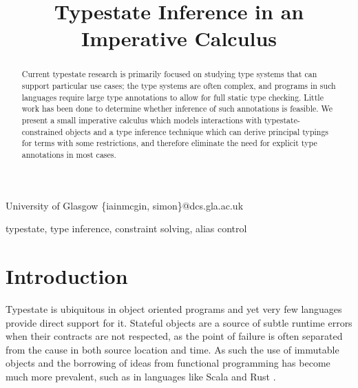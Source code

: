\documentclass[preprint]{sigplanconf}
\begin{document}
\copyrightdata{[to be supplied]} 


\title{Typestate Inference in an Imperative Calculus}

           {University of Glasgow}
           {\{iainmcgin, simon\}@dcs.gla.ac.uk}

\maketitle

\begin{abstract}
Current typestate research is primarily focused on studying
type systems that can support particular use cases;
the type systems are often complex, and programs in such languages 
require large type annotations to allow for full static type checking. Little
work has been done to determine whether inference of such annotations is 
feasible. We present a small imperative calculus which
models interactions with typestate-constrained objects and a type inference
technique which can derive principal typings for terms with some
restrictions, and therefore eliminate the need for
explicit type annotations in most cases.
\end{abstract}


\keywords
typestate, type inference, constraint solving, alias control

\section{Introduction}

Typestate is ubiquitous in object oriented programs \cite{Beckman2011} and yet
very few languages provide direct support for it. Stateful objects are a source
of subtle runtime errors when their contracts are not respected, as the
point of failure is often separated from the cause in both source location
and time. As such the use of immutable objects and the 
borrowing of ideas from functional programming has become much more prevalent, 
such as in languages like Scala and Rust \cite{Rust}.
\end{document}
